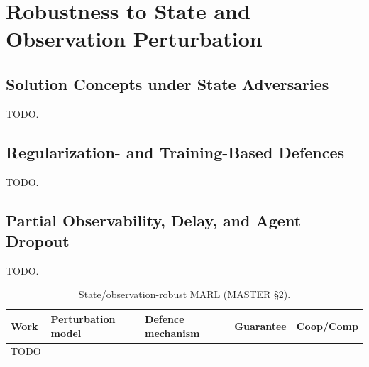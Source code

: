 \section{Robustness to State and Observation Perturbation}
\label{sec:state}

\subsection{Solution Concepts under State Adversaries}
TODO.

\subsection{Regularization- and Training-Based Defences}
TODO.

\subsection{Partial Observability, Delay, and Agent Dropout}
TODO.

\begin{table}[t]\centering\footnotesize
\caption{State/observation-robust MARL (MASTER \S2).}
\label{tab:state}
\begin{tabular}{lllll}
\toprule
Work & Perturbation model & Defence mechanism & Guarantee & Coop/Comp \\
\midrule
TODO & & & & \\
\bottomrule
\end{tabular}
\end{table}

